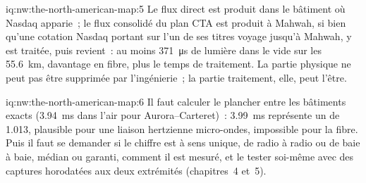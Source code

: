\begin{solution}{iq:nw:the-north-american-map:5}
Le flux direct est produit dans le bâtiment où Nasdaq apparie~; le flux consolidé du plan CTA est produit à Mahwah, si bien qu'une cotation Nasdaq
portant sur l'un de ses titres voyage jusqu'à Mahwah, y est traitée, puis revient~: au moins \qty{371}{\micro\second} de lumière dans le vide sur les
\qty{55.6}{\kilo\metre}, davantage en fibre, plus le temps de traitement. La partie physique ne peut pas être supprimée par l'ingénierie~; la partie traitement, elle, peut l'être.
\end{solution}

\begin{solution}{iq:nw:the-north-american-map:6}
Il faut calculer le plancher entre les bâtiments exacts (\qty{3.94}{\milli\second} dans l'air pour Aurora--Carteret)~: \qty{3.99}{\milli\second} représente un
 de 1.013, plausible pour une liaison hertzienne micro-ondes, impossible pour la fibre. Puis il faut se demander si le chiffre est à sens unique, de radio à radio ou de baie à baie,
médian ou garanti, comment il est mesuré, et le tester soi-même avec des captures horodatées aux deux extrémités (chapitres~4 et~5).
\end{solution}

